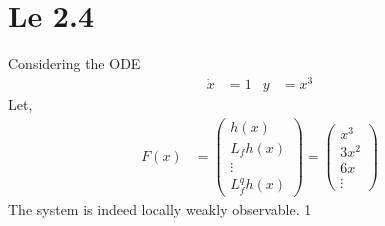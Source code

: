 \section{Le 2.4}
Considering the ODE
\begin{align*}
    \dot x &= 1 & y &= x^3
\end{align*}
Let, 
\begin{align*}
    F(x) &= \begin{pmatrix}
        h(x) \\ L_fh(x) \\ \vdots \\ L_f^qh(x)
    \end{pmatrix} = \begin{pmatrix}
        x^3 \\ 3x^2 \\ 6x \\ \vdots 
    \end{pmatrix}
\end{align*}
The system is indeed locally weakly observable. 1

